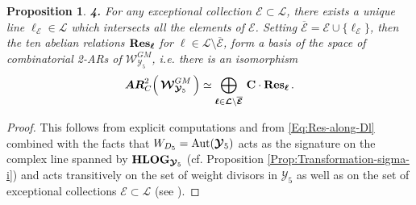 \documentclass[11pt]{amsart}
\newtheorem{prop}[thm]{Proposition}
\begin{document}
\begin{prop}
\noindent  
 {\bf 4.} For any exceptional collection $\boldsymbol{\mathcal E}\subset 
\boldsymbol{\mathcal L}$, there exists a unique line $\ell_{\boldsymbol{\mathcal E}}\in 
\boldsymbol{\mathcal L}$ which intersects all the elements of $\boldsymbol{\mathcal E}$. 
Setting $\overline{\boldsymbol{\mathcal E}}=\boldsymbol{\mathcal E}
\cup \{ \ell_{\boldsymbol{\mathcal E}} \}$, 
then 
the ten  
abelian relations 
 ${\bf Res}_{\boldsymbol{\ell}}$ for  $\boldsymbol{\ell}\in 
 \boldsymbol{\mathcal L}\setminus 
 \overline{\boldsymbol{\mathcal E}}$,  form a basis of the space of combinatorial 2-ARs of ${\boldsymbol{\mathcal W}_{\boldsymbol{\mathcal Y}_5}^{GM}}$, i.e.
 there is an isomorphism
$$
\boldsymbol{AR}^2_C\Big( \,{\boldsymbol{\mathcal W}_{\boldsymbol{\mathcal Y}_5}^{GM}} \, \Big) \simeq \bigoplus_{\boldsymbol{\ell}\in 
 \boldsymbol{\mathcal L}\setminus 
 \overline{\boldsymbol{\mathcal E}}}  
 \, \mathbf C\cdot  
{\bf Res}_{\boldsymbol{\ell}}
\, .
$$
\end{prop}%
\begin{proof}
This follows from explicit computations and  from \eqref{Eq:Res-along-Dl} combined with the facts that $W_{D_5}={\rm Aut}(\boldsymbol{\mathcal Y}_5)$ 
acts as the signature on the complex line spanned by  ${\bf HLOG}_{\boldsymbol{\mathcal Y}_5}$ (cf. Proposition \ref{Prop:Transformation-sigma-i}) and 
acts transitively on the set of weight divisors in $\boldsymbol{\mathcal Y}_5$ as well as on the set of exceptional collections $\boldsymbol{\mathcal E}\subset 
\boldsymbol{\mathcal L}$ (see \cite[Corollary 26.8]{Manin}). 
\end{proof}







\end{document}
